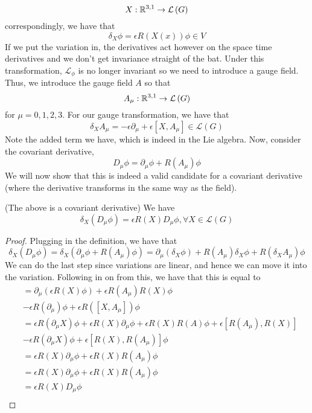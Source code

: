 \[
	X : \mathbb{R} ^{ 3, 1 } \to \mathcal{ L } \left( G  \right) 
\] correspondingly, we have that 
\[
 \delta _ X \phi  = \epsilon R ( X ( x ) ) \phi \in V 
\] If we put the variation in, 
the derivatives act however on the space time 
derivatives and we don't get invariance straight 
of the bat. Under this transformation, 
$\mathcal{ L } _ \phi $ is no longer invariant 
so we need to introduce a gauge field. 
Thus, we introduce the gauge field $ A $
so that 
 \[
	 A _ \mu : \mathbb{R} ^{ 3, 1 } \to \mathcal{ L } \left( G  \right) 
\] for $ \mu  = 0 , 1 , 2,  3$.
For our gauge transformation, we 
have that 
 \[
 \delta _X A _ \mu  = - \epsilon \partial  _ \mu + \epsilon \left[  
 X ,  A_ \mu \right]  \in \mathcal{ L } \left( G  \right) 
\] Note the added term we have, which 
is indeed in the Lie algebra. 
Now, consider the covariant derivative, 
\[
	D _ \mu \phi  = \partial  _ \mu \phi +  R( A _ \mu ) \phi 
\] We will now show that this is indeed 
a valid candidate for a covariant derivative (where 
the derivative transforms in the same way as the field). 
\begin{claim}{(The above is a covariant derivative)}
	We have 
	\[
		\delta _ X \left( D _ \mu \phi  \right)   = \epsilon  R( X )
		D _ \mu \phi , \forall X \in \mathcal{ L } \left( G  \right) 
	\] 
	\begin{proof}
		Plugging in the definition, we 
		have that 
		\[
		 \delta _ X \left( D _ \mu \phi  \right)  
		  = \delta _ X \left( \partial  _ \mu 
		  \phi + R ( A _ \mu ) \phi \right)  
		  = \partial  _ \mu \left( \delta _X \phi  \right)  
		  + R ( A _ \mu ) \delta _ X \phi + 
		  R \left( \delta _ X A _ \mu  \right)  \phi 
		\] We can do the last 
		step since variations are linear, and 
		hence we can move it into the variation. 
		Following in on from this, we 
		have that this is equal to 
		\begin{align*}
			&=  \partial  _ \mu \left( \epsilon  R( X ) \phi  \right)  + \epsilon R \left( A _ \mu  \right)  R ( X ) \phi  \\ 
			&  - \epsilon R ( \partial  _ \mu ) \phi + \epsilon 
			R \left( \left[ X, A _ \mu  \right]   \right)  \phi \\
			&=  \epsilon R ( \partial  _ \mu X ) \phi + 
			\epsilon R ( X  ) \partial  _ \mu \phi + \epsilon R ( X ) R ( A ) \phi + \epsilon \left[   R( A _\mu) , R ( X ) \right]  \\
			& - \epsilon R \left( \partial  _ \mu X  \right) \phi + \epsilon \left[  R ( X ) , R ( A _ \mu )  \right]  \phi \\
			&=  \epsilon  R( X ) \partial _ \mu \phi 
			+ \epsilon R ( X ) R ( A _ \mu ) \phi \\
			&=  \epsilon  R( X ) \partial  _ \mu \phi 
			+ \epsilon R ( X ) R \left( A _ \mu  \right)  \phi \\
			&=  \epsilon  R( X ) D _ \mu \phi  \\
		\end{align*} 
	\end{proof}
\end{claim}
